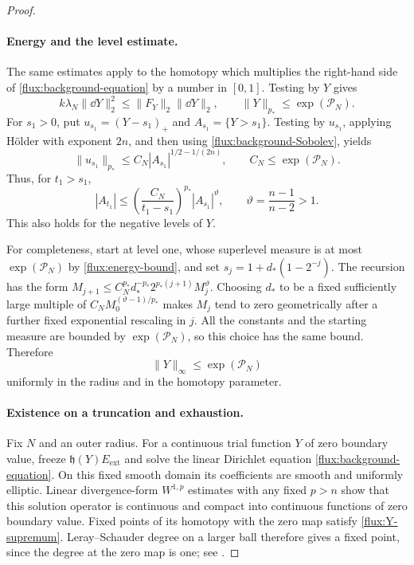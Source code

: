 \begin{proof}
\paragraph{Energy and the level estimate.}
The same estimates apply to the homotopy which multiplies the right-hand
side of \eqref{flux:background-equation} by a number in $[0,1]$.
Testing by $Y$ gives
\begin{equation}
 k\lambda_N\|\dd Y\|_2^2
 \leq\|F_Y\|_2\|\dd Y\|_2,
 \qquad \|Y\|_{p_*}\leq\exp(\mathcal P_N).
 \label{flux:energy-bound}
\end{equation}
For $s_1>0$, put $u_{s_1}=(Y-s_1)_+$ and
$A_{s_1}=\{Y>s_1\}$.  Testing by $u_{s_1}$, applying H\"older with exponent
$2n$, and then using \eqref{flux:background-Sobolev}, yields
\begin{equation}
 \|u_{s_1}\|_{p_*}
 \leq C_N |A_{s_1}|^{1/2-1/(2n)},
 \qquad C_N\leq\exp(\mathcal P_N).
 \label{flux:level-norm}
\end{equation}
Thus, for $t_1>s_1$,
\begin{equation}
 |A_{t_1}|\leq
 \left(\frac{C_N}{t_1-s_1}\right)^{p_*}
 |A_{s_1}|^{\vartheta},
 \qquad \vartheta=\frac{n-1}{n-2}>1.
 \label{flux:level-recursion}
\end{equation}
This also holds for the negative levels of $Y$.

For completeness, start at level one, whose superlevel measure is at most
$\exp(\mathcal P_N)$ by \eqref{flux:energy-bound}, and set
$s_j=1+d_*(1-2^{-j})$.  The recursion has the form
$M_{j+1}\leq C_N^{p_*}d_*^{-p_*}2^{p_*(j+1)}M_j^\vartheta$.
Choosing $d_*$ to be a fixed sufficiently large multiple of
$C_N M_0^{(\vartheta-1)/p_*}$ makes $M_j$ tend to zero geometrically after
a further fixed exponential rescaling in $j$.  All the constants and the
starting measure are bounded by $\exp(\mathcal P_N)$, so this choice has
the same bound.  Therefore
\begin{equation}
 \|Y\|_\infty\leq\exp(\mathcal P_N)
 \label{flux:Y-supremum}
\end{equation}
uniformly in the radius and in the homotopy parameter.

\paragraph{Existence on a truncation and exhaustion.}
Fix $N$ and an outer radius.  For a continuous trial function $Y$ of zero
boundary value, freeze $\mathfrak h(Y)E_{\mathrm{ext}}$ and solve the linear
Dirichlet equation \eqref{flux:background-equation}.  On this fixed smooth
domain its coefficients are smooth and uniformly elliptic.  Linear
divergence-form $W^{1,p}$ estimates with any fixed $p>n$ show that this
solution operator is continuous and compact into continuous functions of
zero boundary value.  Fixed points of its homotopy with the zero map
satisfy \eqref{flux:Y-supremum}.  Leray--Schauder degree on a larger ball
therefore gives a fixed point, since the degree at the zero map is one;
see \cite[Sections 12--17]{LeraySchauder1934}.


\end{proof}
